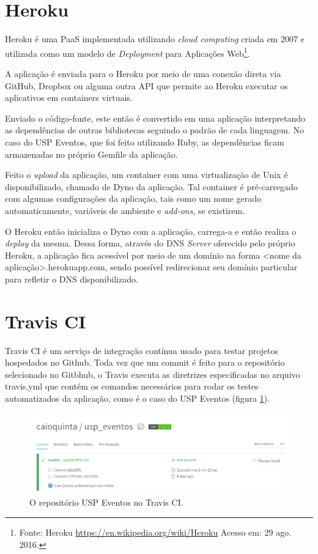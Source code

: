 \section{Heroku}
\par Heroku é uma PaaS implementada utilizando \emph{cloud computing} criada em 2007 e utilizada como um modelo de \emph{Deployment} para Aplicações Web\footnote{Fonte: Heroku \url{https://en.wikipedia.org/wiki/Heroku} Acesso em: 29 ago. 2016.}.
\par  A aplicação é enviada para o Heroku por meio de uma conexão direta via GitHub, Dropbox ou alguma outra API que permite ao Heroku executar os aplicativos em containers virtuais.
\par Enviado o código-fonte, este então é convertido em uma aplicação interpretando as dependências de outras bibliotecas seguindo o padrão de cada linguagem. No caso do USP Eventos, que foi feito utilizando Ruby, as dependências ficam armazenadas no próprio Gemfile da aplicação.
\par Feito o \emph{upload} da aplicação, um container com uma virtualização de Unix é disponibilizado, chamado de Dyno da aplicação. Tal container é pré-carregado com algumas configurações da aplicação, tais como um nome gerado automaticamente, variáveis de ambiente e \emph{add-ons}, se existirem.
\par O Heroku então inicializa o Dyno com a aplicação, carrega-a e então realiza o \emph{deploy} da mesma. Dessa forma, através do DNS \emph{Server} oferecido pelo próprio Heroku, a aplicação fica acessível por meio de um domínio na forma <nome da aplicação>.herokuapp.com, sendo possível redirecionar seu domínio particular para refletir o DNS disponibilizado.
\section{Travis CI}
\par Travis CI é um serviço de integração contínua usado para testar projetos hospedados no Github. Toda vez que um commit é feito para o repositório selecionado no Gitbhub, o Travis executa as diretrizes especificadas no arquivo travis.yml que contém os comandos necessários para rodar os testes automatizados da aplicação, como é o caso do USP Eventos (figura \ref{fig:travis}).
\begin{figure}[htb]
\centering
\includegraphics[width=15cm]{figuras/travis}
\caption{\label{fig:travis} O repositório USP Eventos no Travis CI.}
\end{figure}

